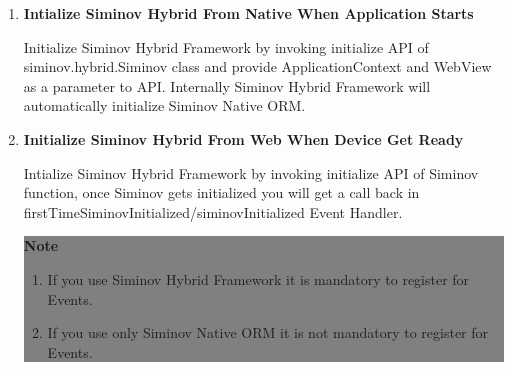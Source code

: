 \begin{enumerate}

	\item \small \textbf{Intialize Siminov Hybrid From Native When Application Starts}
		
		Initialize Siminov Hybrid Framework by invoking initialize API of siminov.hybrid.Siminov class and provide ApplicationContext and WebView as a parameter to API. Internally Siminov Hybrid Framework will automatically initialize Siminov Native ORM.
		

	\item \small \textbf{Initialize Siminov Hybrid From Web When Device Get Ready}
		
		Intialize Siminov Hybrid Framework by invoking initialize API of Siminov function, once Siminov gets initialized you will get a call back in firstTimeSiminovInitialized/siminovInitialized Event Handler.

		
	
		\begin{center}
			\colorbox{grey}{
				\parbox[t]{.8\linewidth}{
					\fontsize{11pt}{11pt}\selectfont %
					\vspace*{0.1cm} %
		
					\hfill \textbf{Note} \\
					
						\begin{enumerate}
			
							\item \small If you use Siminov Hybrid Framework it is mandatory to register for Events.
			
							\item \small If you use only Siminov Native ORM it is not mandatory to register for Events.

						\end{enumerate}					



					\vspace*{0.0cm} %
				}
			}

		\end{center}


\end{enumerate}






